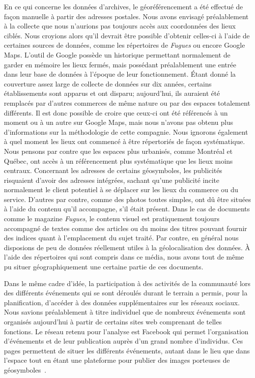 En ce qui concerne les données d'archives, le géoréférencement a été effectué de façon manuelle à partir des adresses postales.
Nous avons envisagé préalablement à la collecte que nous n'aurions pas toujours accès aux coordonnées des lieux ciblés.
Nous croyions alors qu'il devrait être possible d'obtenir celles-ci à l'aide de certaines sources de données, comme les répertoires de \emph{Fugues} ou encore Google Maps.
L'outil de Google possède un historique permettant normalement de garder en mémoire les lieux fermés, mais possédant préalablement une entrée dans leur base de données à l'époque de leur fonctionnement.
Étant donné la couverture assez large de collecte de données sur dix années, certains établissements sont apparus et ont disparu; aujourd'hui, ils auraient été remplacés par d'autres commerces de même nature ou par des espaces totalement différents.
Il est donc possible de croire que ceux-ci ont été référencés à un moment ou à un autre sur Google Maps, mais nous n'avons pas obtenu plus d'informations sur la méthodologie de cette compagnie.
Nous ignorons également à quel moment les lieux ont commencé à être répertoriés de façon systématique.
Nous pensons par contre que les espaces plus urbanisés, comme Montréal et Québec, ont accès à un référencement plus systématique que les lieux moins centraux.
Concernant les adresses de certains géosymboles, les publicités risquaient d'avoir des adresses intégrées, sachant qu'une publicité incite normalement le client potentiel à se déplacer sur les lieux du commerce ou du service.
D'autres par contre, comme des photos toutes simples, ont dû être situées à l'aide du contenu qu'il accompagne, s'il était présent.
Dans le cas de documents comme le magazine \emph{Fugues}, le contenu visuel est pratiquement toujours accompagné de textes comme des articles ou du moins des titres pouvant fournir des indices quant à l'emplacement du sujet traité.
Par contre, en général nous disposions de peu de données réellement utiles à la géolocalisation des données.
À l'aide des répertoires qui sont compris dans ce média, nous avons tout de même pu situer géographiquement une certaine partie de ces documents.

Dans le même cadre d'idée, la participation à des activités de la communauté \lgbt{} lors des différents événements qui se sont déroulés durant le terrain a permis, pour la planification, d'accéder à des données supplémentaires sur les réseaux sociaux.
Nous savions préalablement à titre individuel que de nombreux événements sont organisés aujourd'hui à partir de certains sites web comprenant de telles fonctions.
Le réseau retenu pour l'analyse est Facebook qui permet l'organisation d'événements et de leur publication auprès d'un grand nombre d'individus.
Ces pages permettent de situer les différents événements, autant dans le lieu que dans l'espace tout en étant une plateforme pour publier des images porteuses de géosymboles~\citep{Barkhuus2010,boyd2007}.


